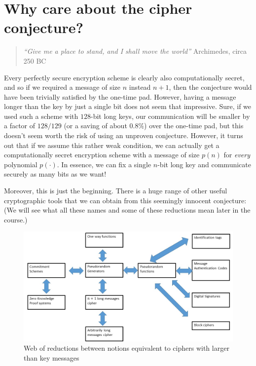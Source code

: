 \section{Why care about the cipher
conjecture?}\label{2-Why-care-about-the-cip}

\begin{quote}
\emph{``Give me a place to stand, and I shall move the world''}
Archimedes, circa 250 BC
\end{quote}

Every perfectly secure encryption scheme is clearly also computationally
secret, and so if we required a message of size \(n\) instead \(n+1\),
then the conjecture would have been trivially satisfied by the one-time
pad. However, having a message longer than the key by just a single bit
does not seem that impressive. Sure, if we used such a scheme with
\(128\)-bit long keys, our communication will be smaller by a factor of
\(128/129\) (or a saving of about \(0.8\%\)) over the one-time pad, but
this doesn't seem worth the risk of using an unproven conjecture.
However, it turns out that if we assume this rather weak condition, we
can actually get a computationally secret encryption scheme with a
message of size \(p(n)\) for \emph{every} polynomial \(p(\cdot)\). In
essence, we can fix a single \(n\)-bit long key and communicate securely
as many bits as we want!

Moreover, this is just the beginning. There is a huge range of other
useful cryptographic tools that we can obtain from this seemingly
innocent conjecture: (We will see what all these names and some of these
reductions mean later in the course.)

\begin{figure}
\centering
\includegraphics[width=\textwidth, height=0.25\paperheight, keepaspectratio]{../figure/privatekey-reduction-web.jpg}
\caption{Web of reductions between notions equivalent to ciphers with
larger than key messages}
\label{tmplabelfig}
\end{figure}


